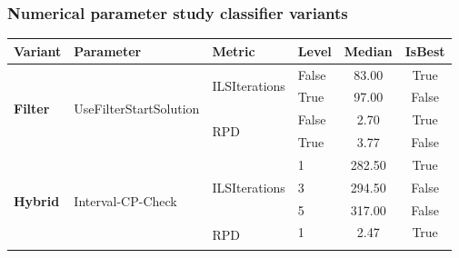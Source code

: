 \subsubsection{Numerical parameter study classifier variants}
\begin{table}[!ht]
	\tiny
	\centering
	\renewcommand{\multirowsetup}{\centering}
	\begin{tabular}{@{}l l l l c c @{}}
		\toprule
		\textbf{Variant}                      & \textbf{Parameter}                           & \textbf{Metric}                     & \textbf{Level}       & \textbf{Median} & \textbf{IsBest} \\
		\midrule
		\multirow[t]{4}{*}{\textbf{Filter}}   & \multirow[t]{4}{*}{UseFilterStartSolution}   & \multirow[t]{2}{*}{ILSIterations}   & False                & 83.00           & True            \\\cmidrule(lr){4-6}
		                                      &                                              &                                     & True                 & 97.00           & False           \\\cmidrule(lr){3-6}
		                                      &                                              & \multirow[t]{2}{*}{RPD}             & False                & 2.70            & True            \\\cmidrule(lr){4-6}
		                                      &                                              &                                     & True                 & 3.77            & False           \\\midrule
		\multirow[t]{24}{*}{\textbf{Hybrid}}  & \multirow[t]{9}{*}{Interval-CP-Check}        & \multirow[t]{3}{*}{ILSIterations}   & 1                    & 282.50          & True            \\\cmidrule(lr){4-6}
		                                      &                                              &                                     & 3                    & 294.50          & False           \\\cmidrule(lr){4-6}
		                                      &                                              &                                     & 5                    & 317.00          & False           \\\cmidrule(lr){3-6}
		                                      &                                              & \multirow[t]{3}{*}{RPD}             & 1                    & 2.47            & True            \\\cmidrule(lr){4-6}

\end{tabular}
\end{table}
